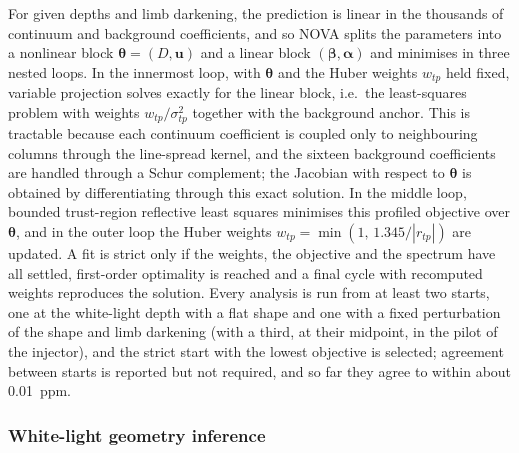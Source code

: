 For given depths and limb darkening, the prediction is linear in the
thousands of continuum and background coefficients, and so NOVA splits the
parameters into a nonlinear block $\bm{\theta}=(D,\bm{u})$ and a linear
block $(\bm{\beta},\bm{\alpha})$ and minimises in three nested loops. In the innermost loop, with $\bm{\theta}$ and the Huber weights $w_{tp}$
held fixed, variable projection \citep{GolubPereyra1973} solves exactly for
the linear block, i.e.\ the least-squares problem with weights
$w_{tp}/\sigma_{tp}^2$ together with the background anchor. This is tractable
because each continuum coefficient is coupled only to neighbouring columns
through the line-spread kernel, and the sixteen background coefficients are
handled through a Schur complement; the Jacobian with respect to
$\bm{\theta}$ is obtained by differentiating through this exact solution. In the middle loop, bounded trust-region reflective least
squares \citep{BranchColemanLi1999} minimises this profiled objective over
$\bm{\theta}$, and in the outer loop the Huber weights
$w_{tp}=\min(1,\,1.345/|r_{tp}|)$ \citep{Huber1964} are updated. A fit is strict
only if the weights, the objective and the spectrum have all settled,
first-order optimality is reached and a final cycle with recomputed weights
reproduces the solution. Every analysis is run from at least two starts, one
at the white-light depth with a flat shape and one with a fixed perturbation
of the shape and limb darkening (with a third, at their midpoint, in the pilot
of the injector), and the strict start with the lowest objective is selected;
agreement between starts is reported but not required, and so far they agree
to within about 0.01~ppm.

\subsubsection{White-light geometry inference}
\label{sec:own-white}

